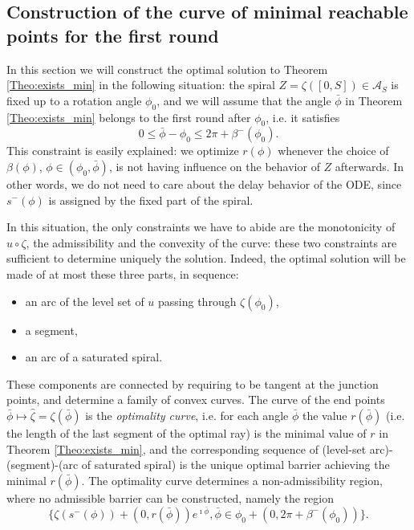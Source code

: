 \documentclass[reqno]{amsart}
\newcounter{assu}
\theoremstyle{definition} \newtheorem{definition}{Definition}[section]
\theoremstyle{definition} \newtheorem{remark}[definition]{Remark}
\theoremstyle{plain} \newtheorem{lemma}[definition]{Lemma}
\theoremstyle{plain} \newtheorem{proposition}[definition]{Proposition}
\theoremstyle{plain} \newtheorem{theorem}[definition]{Theorem}
\theoremstyle{plain} \newtheorem{corollary}[definition]{Corollary}
\theoremstyle{definition} \newtheorem{example}[definition]{Example}
\theoremstyle{plain} \newtheorem{claim}[clai]{Claim}
\theoremstyle{definition} \newtheorem{assumption}[definition]{Assumption}
\theoremstyle{definition} \newtheorem{observation}[definition]{Observation}
\newcommand{\1}{\mathbbm 1}
\renewcommand{\i}{\imath}
\numberwithin{equation}{section} %
\theoremstyle{plain} \newtheorem*{theorem*}{Theorem}
\theoremstyle{plain} \newtheorem{mthm}[maintheorem]{Main Theorem}
\theoremstyle{plain} \newtheorem*{mthm*}{Main Theorem}
\theoremstyle{plain} \newtheorem*{conjecture*}{Conjecture}
\theoremstyle{plain} \newtheorem{conjecture}[definition]{Conjecture}
\theoremstyle{plain} \newtheorem*{problem*}{Problem}
\begin{document}
\subsection{Construction of the curve of minimal reachable points for the first round}
\label{Ss:minimal_reach}


In this section we will construct the optimal solution to Theorem \ref{Theo:exists_min} in the following situation: the spiral $Z = \zeta([0,S]) \in \mathcal{A}_S$ is fixed up to a rotation angle ${\phi_0}$, and we will assume that the angle ${\bar \phi}$ in Theorem \ref{Theo:exists_min} belongs to the first round after $\phi_0$, i.e. it satisfies
$$
0 \leq {\bar \phi} - {\phi_0} \leq 2\pi + \beta^-({\phi_0}). 
$$
This constraint is easily explained: we optimize $r(\phi)$ whenever the choice of $\beta(\phi)$, $\phi \in ({\phi_0},{\bar \phi})$, is not having influence on the behavior of $Z$ afterwards. In other words, we do not need to care about the delay behavior of the ODE, since $s^-(\phi)$ is assigned by the fixed part of the spiral.

In this situation, the only constraints we have to abide are the monotonicity of $u \circ \zeta$, the admissibility and the convexity of the curve: these two constraints are sufficient to determine uniquely the solution. Indeed, the optimal solution will be made of at most these three parts, in sequence:
\begin{itemize}
\item  an arc of the level set of $u$ passing through $\zeta({\phi_0})$,
\item a segment,
\item an arc of a saturated spiral.
\end{itemize}
These components are connected by requiring to be tangent at the junction points, and determine a family of convex curves. The curve of the end points ${\bar \phi} \mapsto \hat \zeta = \zeta({\bar \phi})$ is the \emph{optimality curve}, i.e. for each angle ${\bar \phi}$ the value $r({\bar \phi})$ (i.e. the length of the last segment of the optimal ray) is the minimal value of $r$ in Theorem \ref{Theo:exists_min}, and the corresponding sequence of (level-set arc)-(segment)-(arc of saturated spiral) is the unique optimal barrier achieving the minimal $r({\bar \phi})$. The optimality curve determines a non-admissibility region, where no admissible barrier can be constructed, namely the region
$$
\Big\{ \zeta(s^-(\phi)) + (0,r(\bar \phi)) e^{\i \bar \phi}, \bar \phi \in \phi_0 + (0,2\pi + \beta^-(\phi_0)) \Big\}.
$$
\end{document}
